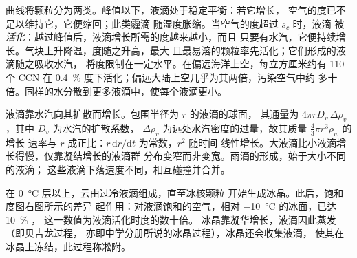 曲线将颗粒分为两类。峰值以下，液滴处于稳定平衡：若它增长，
空气的度已不足以维持它，它便缩回；此类霾滴
随湿度胀缩。当空气的度超过 $s_c$ 时，液滴
被\emph{活化}：越过峰值后，液滴增长所需的度越来越小，而且
只要有水汽，它便持续增长。气块上升降温，度随之升高，最大
且最易溶的颗粒率先活化；它们形成的液滴随之吸收水汽，
将度限制在一定水平。在偏远海洋上空，每立方厘米约有 110 个 CCN
在 \qty{0.4}{\percent} 度下活化；偏远大陆上空几乎为其两倍，污染空气中约
多十倍。同样的水分散到更多液滴中，使每个液滴更小。

\begin{remark}[为何仅凝结不能成雨]\label{rem:b2:atmospheric-thermodynamics:growth}
液滴靠水汽向其扩散而增长。包围半径为 $r$ 的液滴的球面，
其通量为 $4\pi r D_v\,\Delta\rho_v$，其中 $D_v$ 为水汽的扩散系数，
$\Delta\rho_v$ 为远处水汽密度的过量，故其质量 $\tfrac43\pi r^3\rho_w$ 的增长
速率与 $r$ 成正比：$r\,\mathrm{d}r/\mathrm{d}t$ 为常数，$r^2$ 随时间
线性增长。大液滴比小液滴增长得慢，仅靠凝结增长的液滴群
分布变窄而非变宽。雨滴的形成，始于大小不同的液滴；
这些液滴下落速度不同，相互碰撞并合并。
\end{remark}

在 \qty{0}{\celsius} 层以上，云由过冷液滴组成，直至冰核颗粒
开始生成冰晶。此后，饱和度图右图所示的差异
起作用：对液滴饱和的空气，相对 \qty{-10}{\celsius} 的冰面，已达 \qty{10}{\percent} ，
这一数值为液滴活化时度的数十倍。
冰晶靠凝华增长，液滴因此蒸发（即贝吉龙过程，
亦即中学分册所说的冰晶过程），冰晶还会收集液滴，
使其在冰晶上冻结，此过程称凇附。

